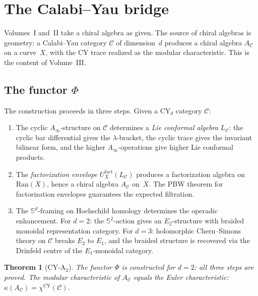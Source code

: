 \documentclass[11pt,reqno]{amsart}
\newtheorem{theorem}{Theorem}[section]
\theoremstyle{definition}
\theoremstyle{remark}
\newcommand{\Ran}{\mathrm{Ran}}
\numberwithin{equation}{section}
\begin{document}
\section{The Calabi--Yau bridge}
\label{sec:cy-bridge}

Volumes~I and~II take a chiral algebra as given. The source
of chiral algebras is geometry: a Calabi--Yau category
$\mathcal{C}$ of dimension~$d$ produces a chiral algebra
$A_\mathcal{C}$ on a curve~$X$, with the CY trace realized
as the modular characteristic. This is the content of
Volume~III.

\subsection{The functor $\Phi$}
\label{ssec:functor-phi}

The construction proceeds in three steps. Given a CY$_d$
category $\mathcal{C}$:

\begin{enumerate}[(1)]
\item The cyclic $A_\infty$-structure on $\mathcal{C}$
 determines a \emph{Lie conformal algebra} $L_\mathcal{C}$:
 the cyclic bar differential gives the $\lambda$-bracket,
 the cyclic trace gives the invariant bilinear form, and
 the higher $A_\infty$-operations give higher Lie conformal
 products.

\item The \emph{factorization envelope}
 $U_X^{\mathrm{fact}}(L_\mathcal{C})$ produces a
 factorization algebra on $\Ran(X)$, hence a chiral algebra
 $A_\mathcal{C}$ on~$X$. The PBW theorem for factorization
 envelopes guarantees the expected filtration.

\item The $\mathbb{S}^d$-framing on Hochschild homology
 determines the operadic enhancement. For $d = 2$: the
 $\mathbb{S}^2$-action gives an $E_2$-structure with braided
 monoidal representation category. For $d = 3$: holomorphic
 Chern--Simons theory on $\mathcal{C}$ breaks $E_2$ to $E_1$,
 and the braided structure is recovered via the Drinfeld centre
 of the $E_1$-monoidal category.
\end{enumerate}

\begin{theorem}[CY-A$_2$]
\label{thm:cy-a2}
The functor $\Phi$ is constructed for $d = 2$: all three steps
are proved. The modular characteristic of $A_\mathcal{C}$
equals the Euler characteristic:
$\kappa(A_\mathcal{C}) = \chi^{\mathrm{CY}}(\mathcal{C})$.
\end{theorem}
\end{document}
